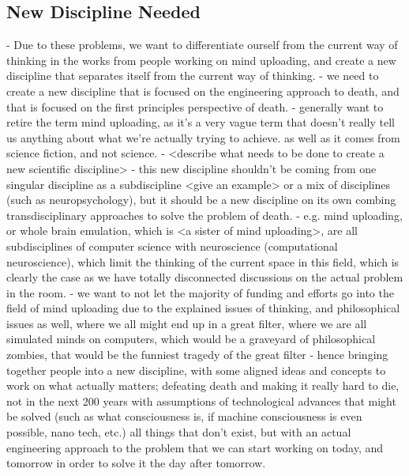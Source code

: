 \documentclass[10pt]{article}
\begin{document}
\begin{sloppypar}
  \subsection{New Discipline Needed}
  \label{sec:new-discipline}


  - Due to these problems, we want to differentiate ourself from the current way of thinking in the works from people working on mind uploading, and create a new discipline that separates itself from the current way of thinking.
  - we need to create a new discipline that is focused on the engineering approach to death, and that is focused on the first principles perspective of death.
  - generally want to retire the term mind uploading, as it's a very vague term that doesn't really tell us anything about what we're actually trying to achieve. as well as it comes from science fiction, and not science.
  - <describe what needs to be done to create a new scientific discipline>
  - this new discipline shouldn't be coming from one singular discipline as a subdiscipline <give an example> or a mix of disciplines (such as neuropsychology), but it should be a new discipline on its own combing transdisciplinary approaches to solve the problem of death.
  - e.g. mind uploading, or whole brain emulation, which is <a sister of mind uploading>, are all subdisciplines of computer science with neuroscience (computational neuroscience), which limit the thinking of the current space in this field, which is clearly the case as we have totally disconnected discussions on the actual problem in the room.
  - we want to not let the majority of funding and efforts go into the field of mind uploading due to the explained issues of thinking, and philosophical issues as well, where we all might end up in a great filter, where we are all simulated minds on computers, which would be a graveyard of philosophical zombies, that would be the funniest tragedy of the great filter
  - hence bringing together people into a new discipline, with some aligned ideas and concepts to work on what actually matters; defeating death and making it really hard to die, not in the next 200 years with assumptions of technological advances that might be solved (such as what consciousness is, if machine consciousness is even possible, nano tech, etc.) all things that don't exist, but with an actual engineering approach to the problem that we can start working on today, and tomorrow in order to solve it the day after tomorrow.


\end{sloppypar}
\end{document}
